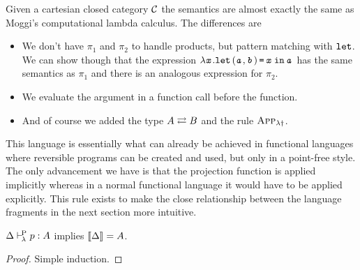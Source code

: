 \documentclass[runningheads,envcountsame]{llncs}
\begin{document}
Given a cartesian closed category $\mathcal{C}$ the semantics are almost exactly the same as Moggi's computational lambda calculus. The differences are
\begin{itemize}
    \item We don't have $\pi_1$ and $\pi_2$ to handle products, but pattern matching with $\texttt{let}$. We can show though that the expression $\lambda \texttt{\textit{x}}. \texttt{let}\,(\texttt{\textit{a}}, \texttt{\textit{b}})\,\texttt{=}\,\texttt{\textit{x}}\,\texttt{in}\,\texttt{\textit{a}}$ has the same semantics as $\pi_1$ and there is an analogous expression for $\pi_2$.
    \item We evaluate the argument in a function call before the function.
    \item And of course we added the type $A \mathrel{{\rightleftarrows}} B$ and the rule $\textsc{App}_{\lambda\dagger}$.
\end{itemize}
This language is essentially what can already be achieved in functional languages where reversible programs can be created and used, but only in a point-free style. The only advancement we have is that the projection function is applied implicitly whereas in a normal functional language it would have to be applied explicitly. This rule exists to make the close relationship between the language fragments in the next section more intuitive.

\begin{lemma}
    $\Delta \vdash^{\!\mathrm{P}}_{\!\lambda} p : A$ implies $\sem{\Delta} = A$.
\end{lemma}
\begin{proof}
    Simple induction.
\end{proof}
\end{document}
